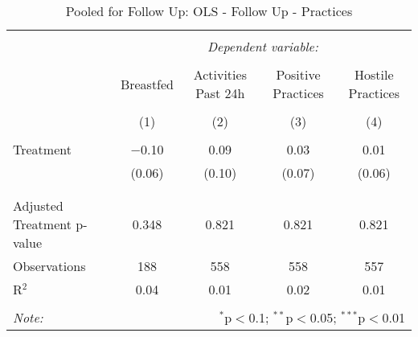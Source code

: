 
\begin{table}[!htbp] \centering 
  \caption{Pooled for Follow Up: OLS - Follow Up - Practices} 
  \label{tbl:Pooled for Follow Up: OLS - Follow Up - Practices} 
\begin{tabular}{@{\extracolsep{5pt}}lcccc} 
\\[-1.8ex]\hline 
\hline \\[-1.8ex] 
 & \multicolumn{4}{c}{\textit{Dependent variable:}} \\ 
\cline{2-5} 
\\[-1.8ex] & Breastfed & Activities Past 24h & Positive Practices & Hostile Practices \\ 
\\[-1.8ex] & (1) & (2) & (3) & (4)\\ 
\hline \\[-1.8ex] 
 Treatment & $-$0.10 & 0.09 & 0.03 & 0.01 \\ 
  & (0.06) & (0.10) & (0.07) & (0.06) \\ 
  & & & & \\ 
\hline \\[-1.8ex] 
Adjusted Treatment p-value & 0.348 & 0.821 & 0.821 & 0.821 \\ 
Observations & 188 & 558 & 558 & 557 \\ 
R$^{2}$ & 0.04 & 0.01 & 0.02 & 0.01 \\ 
\hline 
\hline \\[-1.8ex] 
\textit{Note:}  & \multicolumn{4}{r}{$^{*}$p$<$0.1; $^{**}$p$<$0.05; $^{***}$p$<$0.01} \\ 
\end{tabular} 
\end{table} 
